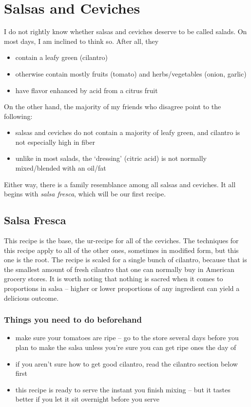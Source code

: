 
\chapter{Salsas and Ceviches}

I do not rightly know whether salsas and ceviches deserve to be called salads. On most days, I am inclined to think so. After all, they \begin{itemize}
    \item contain a leafy green (cilantro)
    \item otherwise contain mostly fruits (tomato) and herbs/vegetables (onion, garlic)
    \item have flavor enhanced by acid from a citrus fruit
\end{itemize}
On the other hand, the majority of my friends who disagree point to the following: \begin{itemize}
    \item salsas and ceviches do not contain a majority of leafy green, and cilantro is not especially high in fiber
    \item unlike in most salads, the `dressing' (citric acid) is not normally mixed/blended with an oil/fat
\end{itemize}
Either way, there is a family resemblance among all salsas and ceviches. It all begins with \textit{salsa fresca}, which will be our first recipe.

\newpage \section{Salsa Fresca}

This recipe is the base, the ur-recipe for all of the ceviches. The techniques for this recipe apply to all of the other ones, sometimes in modified form, but this one is the root. The recipe is scaled for a single bunch of cilantro, because that is the smallest amount of fresh cilantro that one can normally buy in American grocery stores. It is worth noting that nothing is sacred when it comes to proportions in salsa -- higher or lower proportions of any ingredient can yield a delicious outcome.

\subsection{Things you need to do beforehand} \begin{itemize}
    \item make sure your tomatoes are ripe -- go to the store several days before you plan to make the salsa unless you're sure you can get ripe ones the day of
    \item if you aren't sure how to get good cilantro, read the cilantro section below first
    \item this recipe is ready to serve the instant you finish mixing -- but it tastes better if you let it sit overnight before you serve
\end{itemize} 


